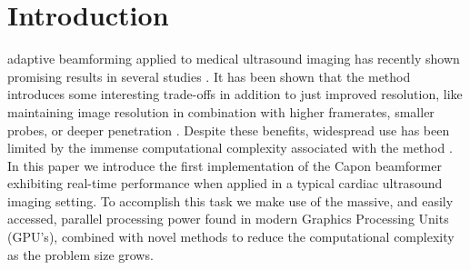 \documentclass[journal]{IEEEtran}
\begin{document}
%
\IEEEpeerreviewmaketitle



\section{Introduction}
% 
% 
% 
% 

 adaptive beamforming \cite{Capon1969} applied to medical ultrasound imaging has recently shown promising results in several studies \cite{Synnevag2007, Austeng2008, Vignon2008, Viola, Mehdizadeh2012}. It has been shown that the method introduces some interesting trade-offs in addition to just improved resolution, like maintaining image resolution in combination with higher framerates, smaller probes, or deeper penetration \cite{Synnevag2009}. Despite these benefits, widespread use has been limited by the immense computational complexity associated with the method \cite{So2011}.  In this paper we introduce the first implementation of the Capon beamformer exhibiting real-time performance when applied in a typical cardiac ultrasound imaging setting. To accomplish this task we make use of the massive, and easily accessed, parallel processing power found in modern Graphics Processing Units (GPU's), combined with novel methods to reduce the computational complexity as the problem size grows. 
\end{document}
